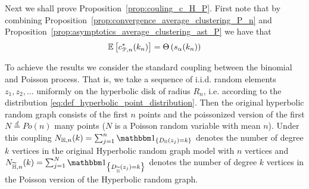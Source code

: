 Next we shall prove Proposition~\ref{prop:couling_c_H_P}. First note that by combining Proposition~\ref{prop:convergence_average_clustering_P_n} and Proposition~\ref{prop:asymptotics_average_clustering_ast_P} we have that
\begin{equation}
	\mathbb{E}\left[c_{{\mathcal P},n}^\ast(k_n)\right] = \Theta\left(s_\alpha(k_n)\right)
\end{equation}

To achieve the results we consider the standard coupling between the binomial and Poisson process. That is, we take a sequence of i.i.d. random elements $z_1, z_2, \dots$ uniformly on the hyperbolic disk of radius $R_n$, i.e. according to the distribution \eqref{eq:def_hyperbolic_point_distribution}. Then the original hyperbolic random graph consists of the first $n$ points and the poissonized version of the first $N \stackrel{d}{=} Po(n)$ many points ($N$ is a Poisson random variable with mean $n$). Under this coupling $N_{\H,n}(k) = \sum_{j=1}^n \ind{D_\H(z_j)=k}$ denotes the number of degree $k$ vertices in the original Hyperbolic random graph model with $n$ vertices and $N_{\HP,n}(k)=\sum_{j=1}^{N} \ind{D_{\HP}(z_j)=k}$ denotes the number of degree $k$ vertices in the Poisson version of the Hyperbolic random graph.

